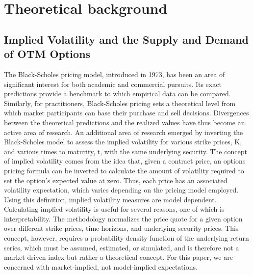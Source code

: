 \documentclass[11pt,a4paper,oldfontcommands]{memoir}
\begin{document}
{%




\section{Theoretical background}

\subsection{Implied Volatility and the Supply and Demand of OTM Options}

The Black-Scholes pricing model, introduced in 1973, has been an area of significant interest for both academic and commercial pursuits. Its exact predictions provide a benchmark to which empirical data can be compared. Similarly, for practitioners, Black-Scholes pricing sets a theoretical level from which market participants can base their purchase and sell decisions. Divergences between the theoretical predictions and the realized values have thus become an active area of research. An additional area of research emerged by inverting the Black-Scholes model to assess the implied volatility for various strike prices, K, and various times to maturity, t, with the same underlying security. The concept of implied volatility comes from the idea that, given a contract price, an options pricing formula can be inverted to calculate the amount of volatility required to set the option's expected value at zero. Thus, each price has an associated volatility expectation, which varies depending on the pricing model employed. Using this definition, implied volatility measures are model dependent. Calculating implied volatility is useful for several reasons, one of which is interpretability. The methodology normalizes the price quote for a given option over different strike prices, time horizons, and underlying security prices. This concept, however, requires a probability density function of the underlying return series, which must be assumed, estimated, or simulated, and is therefore not a market driven index but rather a theoretical concept. For this paper, we are concerned with market-implied, not model-implied expectations. 

}
\end{document}
